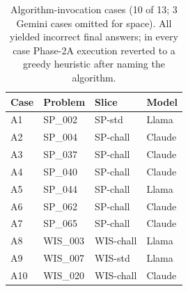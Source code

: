 \begin{table}[t]
  \centering
  \small
  \caption{Algorithm-invocation cases (10 of 13; 3 Gemini cases omitted for
  space). All yielded incorrect final answers; in every case Phase-2A
  execution reverted to a greedy heuristic after naming the algorithm.}
  \label{tab:invocation}
  \begin{tabular}{llll}
    \toprule
    Case & Problem & Slice & Model \\
    \midrule
    A1 & SP\_002  & SP-std   & Llama  \\
    A2 & SP\_004  & SP-chall & Claude \\
    A3 & SP\_037  & SP-chall & Claude \\
    A4 & SP\_040  & SP-chall & Claude \\
    A5 & SP\_044  & SP-chall & Llama  \\
    A6 & SP\_062  & SP-chall & Claude \\
    A7 & SP\_065  & SP-chall & Claude \\
    A8 & WIS\_003 & WIS-chall& Llama  \\
    A9 & WIS\_007 & WIS-std  & Llama  \\
    A10& WIS\_020 & WIS-chall& Claude \\
    \bottomrule
  \end{tabular}
\end{table}
